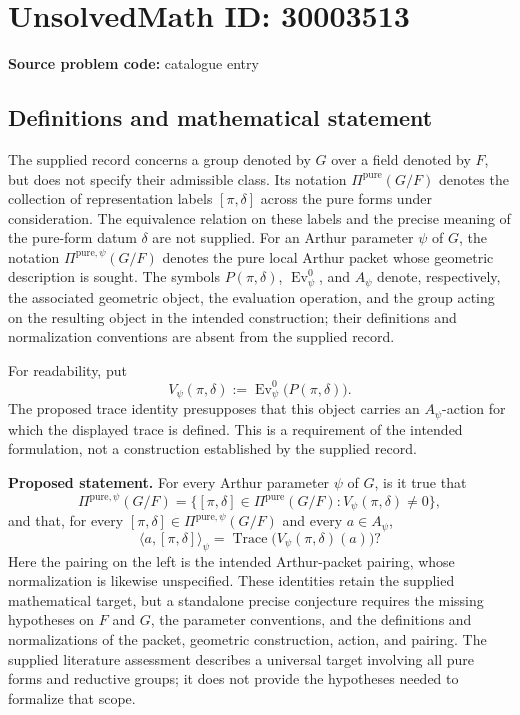 \documentclass[11pt]{article}
\begin{document}
\section*{UnsolvedMath ID: 30003513}
\textbf{Source problem code:} catalogue entry
\subsection{Definitions and mathematical statement}
The supplied record concerns a group denoted by \(G\) over a field denoted by \(F\), but does not specify their admissible class. Its notation \(\Pi^{\mathrm{pure}}(G/F)\) denotes the collection of representation labels \([\pi,\delta]\) across the pure forms under consideration. The equivalence relation on these labels and the precise meaning of the pure-form datum \(\delta\) are not supplied. For an Arthur parameter \(\psi\) of \(G\), the notation \(\Pi^{\mathrm{pure},\psi}(G/F)\) denotes the pure local Arthur packet whose geometric description is sought. The symbols \(P(\pi,\delta)\), \(\operatorname{Ev}^{0}_{\psi}\), and \(A_{\psi}\) denote, respectively, the associated geometric object, the evaluation operation, and the group acting on the resulting object in the intended construction; their definitions and normalization conventions are absent from the supplied record.

For readability, put
\[
V_{\psi}(\pi,\delta):=\operatorname{Ev}^{0}_{\psi}\bigl(P(\pi,\delta)\bigr).
\]
The proposed trace identity presupposes that this object carries an \(A_{\psi}\)-action for which the displayed trace is defined. This is a requirement of the intended formulation, not a construction established by the supplied record.

\textbf{Proposed statement.} For every Arthur parameter \(\psi\) of \(G\), is it true that
\[
\Pi^{\mathrm{pure},\psi}(G/F)
=
\bigl\{[\pi,\delta]\in\Pi^{\mathrm{pure}}(G/F):
V_{\psi}(\pi,\delta)\neq 0\bigr\},
\]
and that, for every \([\pi,\delta]\in\Pi^{\mathrm{pure},\psi}(G/F)\) and every \(a\in A_{\psi}\),
\[
\bigl\langle a,[\pi,\delta]\bigr\rangle_{\psi}
=
\operatorname{Trace}\!\bigl(V_{\psi}(\pi,\delta)(a)\bigr)?
\]
Here the pairing on the left is the intended Arthur-packet pairing, whose normalization is likewise unspecified. These identities retain the supplied mathematical target, but a standalone precise conjecture requires the missing hypotheses on \(F\) and \(G\), the parameter conventions, and the definitions and normalizations of the packet, geometric construction, action, and pairing. The supplied literature assessment describes a universal target involving all pure forms and reductive groups; it does not provide the hypotheses needed to formalize that scope.
\end{document}
